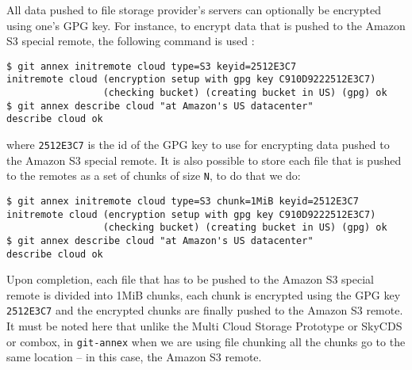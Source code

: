 All data pushed to file storage provider's servers can optionally be
encrypted using one's GPG key. For instance, to encrypt data that is
pushed to the Amazon S3 special remote, the following command is
used \cite{docs:git-annex-as3}:

\begin{verbatim}
$ git annex initremote cloud type=S3 keyid=2512E3C7
initremote cloud (encryption setup with gpg key C910D9222512E3C7) 
                 (checking bucket) (creating bucket in US) (gpg) ok
$ git annex describe cloud "at Amazon's US datacenter"
describe cloud ok
\end{verbatim}

where \verb+2512E3C7+ is the id of the GPG key to use for encrypting
data pushed to the Amazon S3 special remote. It is also possible to
store each file that is pushed to the remotes as a set of chunks of
size \verb+N+, to do that we do:

\begin{verbatim}
$ git annex initremote cloud type=S3 chunk=1MiB keyid=2512E3C7
initremote cloud (encryption setup with gpg key C910D9222512E3C7) 
                 (checking bucket) (creating bucket in US) (gpg) ok
$ git annex describe cloud "at Amazon's US datacenter"
describe cloud ok
\end{verbatim}

Upon completion, each file that has to be pushed to the Amazon S3 special
remote is divided into 1MiB chunks, each chunk is encrypted using the
GPG key \verb+2512E3C7+ and the encrypted chunks are finally pushed to
the Amazon S3 remote. It must be noted here that unlike the Multi
Cloud Storage Prototype or SkyCDS or combox, in \verb+git-annex+ when
we are using file chunking all the chunks go to the same location --
in this case, the Amazon S3 remote.
